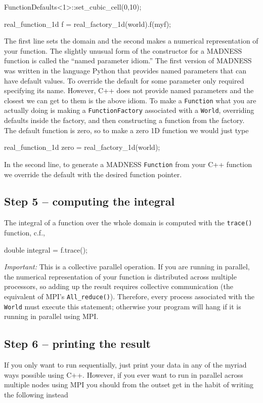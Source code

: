 \documentclass[letterpaper]{article}
\begin{document}
{\ttfamily
FunctionDefaults{\textless}1{\textgreater}::set\_cubic\_cell(0,10);}

{\ttfamily
real\_function\_1d f = real\_factory\_1d(world).f(myf);}


\bigskip

The first line sets the domain and the second makes a numerical representation of your function. The slightly unusual
form of the constructor for a MADNESS function is called the ``named parameter idiom.'' The first version of MADNESS
was written in the language Python that provides named parameters that can have default values. To override the default
for some parameter only required specifying its name. However, C++ does not provide named parameters and the closest we
can get to them is the above idiom. To make a \texttt{Function} what you are actually doing is making a
\texttt{FunctionFactory} associated with a \texttt{World}, overriding defaults inside the factory, and then
constructing a function from the factory. The default function is zero, so to make a zero 1D function we would just
type

{\ttfamily
real\_function\_1d zero = real\_factory\_1d(world);}

In the second line, to generate a MADNESS \texttt{Function} from your C++ function we override the default with the
desired function pointer.

\subsection[Step 5 {}-- computing the integral]{Step 5 -- computing the integral}
\label{bkm:RefHeading39623517}The integral of a function over the whole domain is computed with the \texttt{trace()}
function, c.f.,

{\ttfamily
double integral = f.trace();}


\bigskip

\textit{Important:} This is a collective parallel operation. If you are running in parallel, the numerical
representation of your function is distributed across multiple processors, so adding up the result requires collective
communication (the equivalent of MPI's \texttt{All\_reduce()}). Therefore, every process associated with the
\texttt{World} must execute this statement; otherwise your program will hang if it is running in parallel using MPI.

\subsection[Step 6 {}-- printing the result]{Step 6 -- printing the result}
If you only want to run sequentially, just print your data in any of the myriad ways possible using C++. However, if you
ever want to run in parallel across multiple nodes using MPI you should from the outset get in the habit of writing the
following instead
\end{document}
